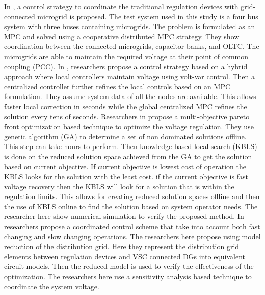 In \cite{NLR_7}, a control strategy to coordinate the traditional regulation devices with grid-connected microgrid is proposed. The test system used in this study is a four bus system with three buses containing microgrids. The problem is formulated as an MPC and solved using a cooperative distributed MPC strategy. They show coordination between the connected microgrids, capacitor banks, and OLTC. The microgrids are able to maintain the required voltage at their point of common coupling (PCC).
In \cite{NLR_8}, researchers propose a control strategy based on a hybrid approach where local controllers maintain voltage using volt-var control. Then a centralized controller further refines the local controls based on an MPC formulation. They assume system data of all the nodes are available. This allows faster local correction in seconds while the global centralized MPC refines the solution every tens of seconds.
Researchers in \cite{NLR_9} propose a multi-objective pareto front optimization based technique to optimize the voltage regulation. They use genetic algorithm (GA) to determine a set of non dominated solutions offline. This step can take hours to perform. Then knowledge based local search (KBLS) is done on the reduced solution space achieved from the GA to get the solution based on current objective. If current objective is lowest cost of operation the KBLS looks for the solution with the least cost. if the current objective is fast voltage recovery then the KBLS will look for a solution that is within the regulation limits. This allows for creating reduced solution spaces offline and then the use of KBLS online to find the solution based on system operator needs. The researcher here show numerical simulation to verify the proposed method.
In \cite{NLR_10} researchers propose a coordinated control scheme that take into account both fast changing and slow changing operations. The researchers here propose using model reduction of the distribution grid. Here they represent the distribution grid elements between regulation devices and VSC connected DGs into equivalent circuit models. Then the reduced model is used to verify the effectiveness of the optimization. The researchers here use a sensitivity analysis based technique to coordinate the system voltage.





